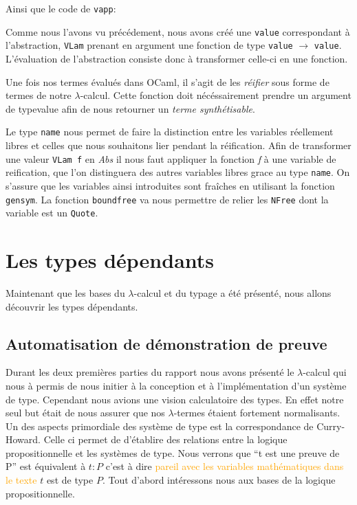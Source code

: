 \documentclass {article}
\newcommand{\codefrom}[3]
           {}
\theoremstyle{definition}
\theoremstyle{remark}
\newcommand{\attention}[1]{\textcolor{orange}{#1}}
\newcommand{\fun}[1]{\lstinline!#1!}
\begin{document}
\codefrom{typed}{lambda}{big_step_eval_exTm_app}
Ainsi que le code de \fun{vapp}: 
\codefrom{typed}{lambda}{vapp}

Comme nous l'avons vu précédement, nous avons créé une \fun{value} correspondant
à l'abstraction, \fun{VLam} prenant en argument une fonction de type \fun{value} $\rightarrow$ \fun{value}.
L'évaluation de l'abstraction consiste donc à transformer celle-ci en une fonction.
\codefrom{typed}{lambda}{big_step_eval_inTm_abs} 

Une fois nos termes évalués dans OCaml, il s'agit de les
\emph{réifier} sous forme de termes de notre
$\lambda$-calcul. Cette fonction doit nécéssairement prendre un argument de
type{value} afin de nous retourner un \emph{terme synthétisable}.

\codefrom{typed}{lambda}{value_to_inTm}
\codefrom{typed}{lambda}{neutral_to_exTm}



Le type \fun{name} nous permet de faire la distinction entre les
variables réellement libres et celles que nous souhaitons lier pendant la réification.
Afin de transformer une valeur \lstinline!VLam f! en
\emph{Abs} il nous faut appliquer la fonction \emph{f} à une variable
de reification, que l'on distinguera des autres variables libres grace au type \fun{name}.
On s'assure que les variables ainsi introduites sont fraîches en utilisant la fonction \fun{gensym}.
La fonction \fun{boundfree} va nous permettre de relier les \fun{NFree} dont la variable est un \fun{Quote}.
\codefrom{typed}{lambda}{boundfree}



\section{Les types dépendants}

Maintenant que les bases du $\lambda$-calcul et du typage a été présenté,
nous allons découvrir les types dépendants. 
 
\subsection{Automatisation de démonstration de preuve}
Durant les deux premières parties du rapport nous avons présenté le $\lambda$-calcul
qui nous à permis de nous initier à la conception et à l'implémentation d'un système de type. Cependant nous avions une vision 
calculatoire des types. En effet notre seul but était de nous assurer que nos $\lambda$-termes
étaient fortement normalisants. 
Un des aspects primordiale des système de type est la correspondance de Curry-Howard.
Celle ci permet de d'établire des relations entre la logique propositionnelle et les systèmes 
de type. Nous verrons que ``t est une preuve de P'' est équivalent à  $t:P$ c'est à dire
\attention{pareil avec les variables mathématiques dans le texte} $t$ est de type $P$.
Tout d'abord intéressons nous aux bases de la logique propositionnelle.
\end{document}

